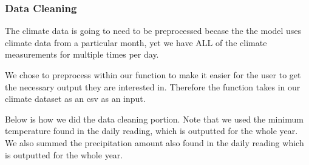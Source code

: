 \documentclass[
]{article}
\begin{document}
\hypertarget{data-cleaning}{%
\subsubsection{Data Cleaning}\label{data-cleaning}}

The climate data is going to need to be preprocessed becase the the
model uses climate data from a particular month, yet we have ALL of the
climate measurements for multiple times per day.

We chose to preprocess within our function to make it easier for the
user to get the necessary output they are interested in. Therefore the
function takes in our climate dataset as an csv as an input.

Below is how we did the data cleaning portion. Note that we used the
minimum temperature found in the daily reading, which is outputted for
the whole year. We also summed the precipitation amount also found in
the daily reading which is outputted for the whole year.
\end{document}
